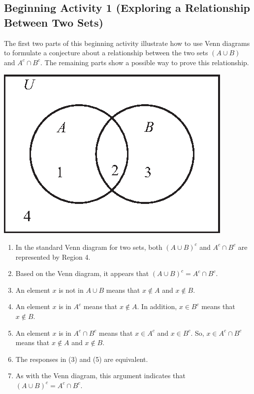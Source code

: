 \documentclass[11pt]{article}
\begin{document}


\subsection*{Beginning Activity 1 (Exploring a Relationship Between Two Sets)}
The first two parts of this beginning activity illustrate how to use Venn diagrams to formulate a conjecture about a relationship between the two sets $(A \cup B)$ and $A^c \cap B^c$.  The remaining parts show a possible way to prove this relationship.
\begin{center}
\includegraphics{figps-venn2.eps}
\end{center}

\begin{enumerate}
\item In the standard Venn diagram for two sets, both  $\left( {A \cup B} \right)^c $  and  
$A^c  \cap B^c $ are represented by Region 4.	

\item Based on the Venn diagram, it appears that $\left( {A \cup B} \right)^c  = A^c  \cap B^c $.

\item An element  $x$  is not in $A \cup B$  means that  $x \notin A$  and  $x \notin B$.

\item An element  $x$  is in  $A^c $ means that  $x \notin A$.  In addition, $x \in B^c $  means that  
$x \notin B$.

\item An element  $x$  is in $A^c  \cap B^c $ means that   $x \in A^c $ and   $x \in B^c $.  So, $x \in A^c  \cap B^c $ means that   $x \notin A$ and   $x \notin B$.

\item The responses in (3) and (5) are equivalent.

\item As with the Venn diagram, this argument indicates that $\left( {A \cup B} \right)^c  = A^c  \cap B^c $.
\end{enumerate}
\hbreak
\end{document}

